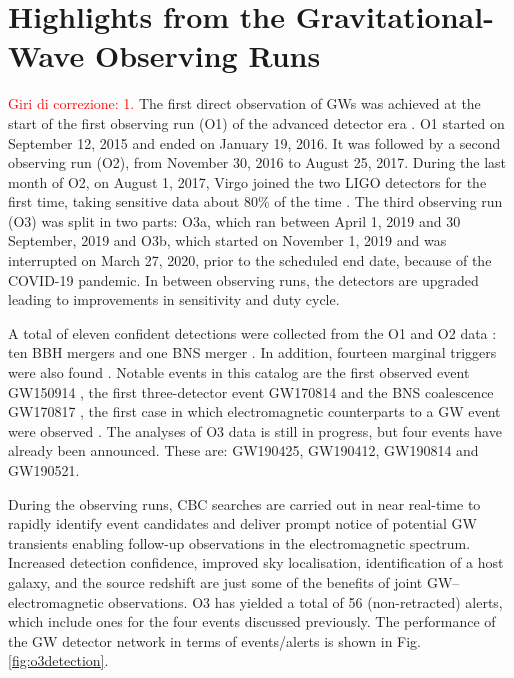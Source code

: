 \documentclass[binding=0.6cm, LaM]{sapthesis}
\newcommand{\fpg}[1]{\textcolor{red}{#1} }
\begin{document}
	
\chapter{Highlights from the Gravitational-Wave Observing Runs}
\label{ch:ObservingRuns}
\fpg{Giri di correzione: 1.}%
	The first direct observation of GWs was achieved at the start of the first observing run (O1) 
	of the advanced detector era \cite{52}.  
	O1 started on September 12, 2015 and ended on January 19, 2016.  
	It was followed by a second observing run (O2), 
	from November 30, 2016 to August 25, 2017.  
	During the last month of O2, on August 1, 2017, Virgo joined the two LIGO detectors for the first time, 	
	taking sensitive data about 80\% of the time \cite{13}.  
	The third observing run (O3) was split in two parts: O3a, which ran between April 1, 2019 and 30 September, 2019 and O3b, 
	which started on November 1, 2019 and was interrupted on March 27, 2020, prior to the scheduled end date, 
	because of the COVID-19 pandemic.  
	In between observing runs, the detectors are upgraded leading to improvements in sensitivity and duty cycle.

	A total of eleven confident detections were collected from the O1 and O2 data \cite{13}: 
	ten BBH mergers \cite{14, 52, 58, 59, 60} and one BNS merger \cite{61}.  
	In addition, fourteen marginal triggers were also found \cite{13}.
	Notable events in this catalog are the first observed event GW150914 \cite{52},
	the first three-detector event GW170814 \cite{60} and the BNS
	coalescence GW170817 \cite{62}, the first case in which electromagnetic counterparts to a GW event 
	were observed \cite{15}.
        The analyses of O3 data is still in progress, but four events have already been announced.  
	These are: GW190425, GW190412, GW190814 and GW190521.

	During the observing runs, CBC searches are carried out in near real-time 
	to rapidly identify event candidates and deliver prompt notice of potential GW transients 
	enabling follow-up observations in the electromagnetic spectrum. 
	Increased detection confidence, improved sky localisation, identification of a host galaxy, 
	and the source redshift are just some of the benefits of joint GW–electromagnetic observations.  
	O3 has yielded a total of 56 (non-retracted) alerts, which include ones for the four events discussed previously.  
	The performance of the GW detector network in terms of events/alerts is shown in Fig.\,\ref{fig:o3detection}. 
\end{document}
